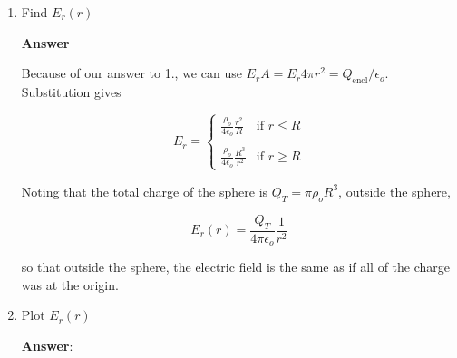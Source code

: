 \documentclass{article}
\newcommand{\ds}[0]{\displaystyle}
\begin{document}
\begin{enumerate}
        
        \else
        \vskip 144pt
        \fi

  \item Find $E_r(r)$

        \ifsolutions
        \textbf{Answer}

        Because of our answer to 1., we can use $E_rA = E_r 4\pi r^2 = {Q_{\text{encl}}}/{\epsilon_o}$. Substitution gives

        $$
        E_r = \begin{cases}
         \ds\frac{\rho_o}{4\epsilon_o}\frac{r^2}{R} &\text{if  }r \le R \\\\
         \ds\frac{\rho_o}{4\epsilon_o} \frac{R^3}{r^2} &\text{if  }r \ge R
        \end{cases}
        $$

        Noting that the total charge of the sphere is $Q_T=\pi\rho_oR^3$, outside the sphere,

        $$E_r(r)=\frac{Q_T}{4\pi \epsilon_o}\frac{1}{r^2}$$

        so that outside the sphere, the electric field is the same as if all of the charge was at the origin.
        \else
        \vskip 144pt
        \fi

  \item Plot $E_r(r)$

        \ifsolutions
        \textbf{Answer}:

        
        \else
        \vskip 96pt
        \fi

\end{enumerate}
\end{document}
